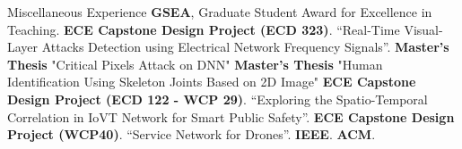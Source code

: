 \begin{rubric}{Miscellaneous Experience}
\entry*[2020] \textbf{GSEA}, Graduate Student Award for Excellence in Teaching.
%
\entry*[2022-2023] \textbf{ECE Capstone Design Project (ECD 323)}. “Real-Time Visual-Layer Attacks
Detection using Electrical Network Frequency Signals”.
\entry*[2019-2020] \textbf{Master's Thesis} "Critical Pixels Attack on DNN"
\entry*[2019-2020] \textbf{Master's Thesis} "Human Identification Using Skeleton Joints Based on 2D Image"
\entry*[2019-2021] \textbf{ECE Capstone Design Project (ECD 122 - WCP 29)}. “Exploring the Spatio-Temporal Correlation in IoVT Network for Smart Public Safety”.
\entry*[2018-2019] \textbf{ECE Capstone Design Project (WCP40)}. “Service Network for Drones”.
%
\entry*[] \textbf{IEEE}.
\entry*[] \textbf{ACM}.
%
\end{rubric}
